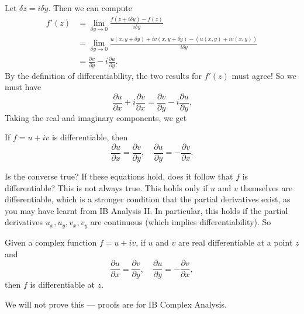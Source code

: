 \documentclass[a4paper]{article}
\begin{document}
Let $\delta z = i \delta y$. Then we can compute
\begin{align*}
  f'(z) &= \lim_{\delta y \to 0} \frac{f(z + i\delta y) - f(z)}{i \delta y}\\
  &= \lim_{\delta y \to 0} \frac{u(x, y + \delta y) + iv(x, y + \delta y) - (u(x, y) + iv(x, y))}{i \delta y}\\
  &= \frac{\partial v}{\partial y} - i \frac{\partial u}{\partial y}.
\end{align*}
By the definition of differentiability, the two results for $f'(z)$ must agree! So we must have
\[
  \frac{\partial u}{\partial x} + i \frac{\partial v}{\partial x} = \frac{\partial v}{\partial y} - i \frac{\partial u}{\partial y}.
\]
Taking the real and imaginary components, we get
\begin{prop}
  If $f = u + iv$ is differentiable, then
  \[
    \frac{\partial u}{\partial x} = \frac{\partial v}{\partial y},\quad \frac{\partial u}{\partial y} = -\frac{\partial v}{\partial x}.
  \]
\end{prop}
Is the converse true? If these equations hold, does it follow that $f$ is differentiable? This is not always true. This holds only if $u$ and $v$ themselves are differentiable, which is a stronger condition that the partial derivatives exist, as you may have learnt from IB Analysis II. In particular, this holds if the partial derivatives $u_x, u_y, v_x, v_y$ are continuous (which implies differentiability). So
\begin{prop}
  Given a complex function $f = u + iv$, if $u$ and $v$ are real differentiable at a point $z$ and
  \[
    \frac{\partial u}{\partial x} = \frac{\partial v}{\partial y},\quad \frac{\partial u}{\partial y} = -\frac{\partial v}{\partial x},
  \]
  then $f$ is differentiable at $z$.
\end{prop}
We will not prove this --- proofs are for IB Complex Analysis.
\end{document}
